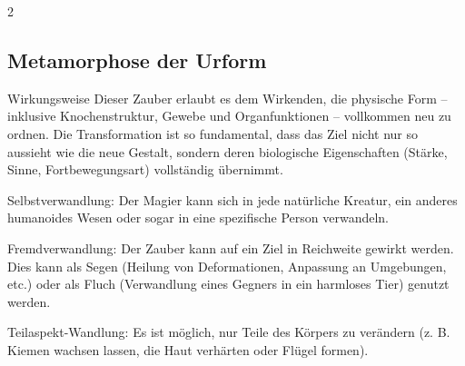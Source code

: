 \begin{multicols*}{2}


\subsection{Metamorphose der Urform}

Wirkungsweise Dieser Zauber erlaubt es dem Wirkenden, die physische Form – inklusive Knochenstruktur, Gewebe und Organfunktionen – vollkommen neu zu ordnen. Die Transformation ist so fundamental, dass das Ziel nicht nur so aussieht wie die neue Gestalt, sondern deren biologische Eigenschaften (Stärke, Sinne, Fortbewegungsart) vollständig übernimmt.

Selbstverwandlung: Der Magier kann sich in jede natürliche Kreatur, ein anderes humanoides Wesen oder sogar in eine spezifische Person verwandeln.

Fremdverwandlung: Der Zauber kann auf ein Ziel in Reichweite gewirkt werden. Dies kann als Segen (Heilung von Deformationen, Anpassung an Umgebungen, etc.) oder als Fluch (Verwandlung eines Gegners in ein harmloses Tier) genutzt werden.

Teilaspekt-Wandlung: Es ist möglich, nur Teile des Körpers zu verändern (z. B. Kiemen wachsen lassen, die Haut verhärten oder Flügel formen).



\end{multicols*}
